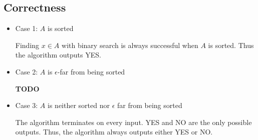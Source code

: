 \subsection*{Correctness}

\begin{itemize}
    \item Case 1: $A$ is sorted
    
    Finding $x \in A$ with binary search is always successful when $A$ is sorted. Thus the algorithm outputs YES. 
    
    \item Case 2: $A$ is $\epsilon$-far from being sorted
    
    \textbf{TODO}
    
    \item Case 3: $A$ is neither sorted nor $\epsilon$ far from being sorted
    
    The algorithm terminates on every input. YES and NO are the only possible outputs. 
    Thus, the algorithm always outputs either YES or NO.
\end{itemize}